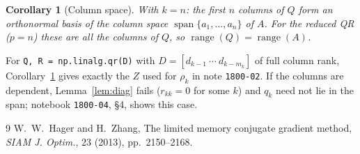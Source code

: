 \documentclass[11pt]{article}
\newtheorem{corollary}{Corollary}
\newcommand{\spn}{\operatorname{span}}
\begin{document}
\begin{corollary}[Column space]\label{cor}
With $k=n$: the first $n$ columns of $Q$ form an orthonormal basis of the
column space $\spn\{a_1,\dots,a_n\}$ of $A$. For the reduced QR ($p=n$) these are
all the columns of $Q$, so $\operatorname{range}(Q)=\operatorname{range}(A)$.
\end{corollary}

For \texttt{Q, R = np.linalg.qr(D)} with $D=[d_{k-1}\ \cdots\ d_{k-m_k}]$ of
full column rank, Corollary~\ref{cor} gives exactly the $Z$ used for
$\rho_k$ in note \texttt{1800-02}. If the columns are dependent,
Lemma~\ref{lem:diag} fails ($r_{kk}=0$ for some $k$) and $q_k$ need not lie in
the span; notebook \texttt{1800-04}, \S4, shows this case.

\begin{thebibliography}{9}
 W.~W.~Hager and H.~Zhang, The limited memory conjugate gradient
method, \emph{SIAM J. Optim.}, 23 (2013), pp.~2150--2168.
\end{thebibliography}
\end{document}
